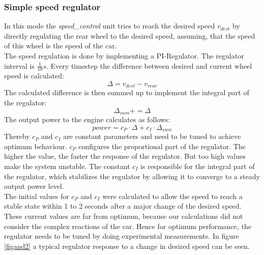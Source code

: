 \documentclass[a4paper
               ,10pt
               ,DIV=10 %
               ,BCOR=0.3cm
               ,pagesize %
               ,headings=small
               ,bibtotoc
               ]
               {scrartcl}
\begin{document}
\subsubsection{Simple speed regulator} \label{simplepi}
In this mode the \emph{speed\_control} unit tries to reach the desired speed $v_{dest}$ by directly regulating the rear wheel to the desired speed, assuming, that the speed of this wheel is the speed of the car.\\
The speed regulation is done by implementing a PI-Regulator. The regulator interval is $\frac{1}{10}s$. Every timestep the difference between desired and current wheel speed is calculated:
$$\Delta = v_{dest} - v_{rear}$$
The calculated difference is then summed up to implement the integral part of the regulator:
$$\Delta_{sum} += \Delta$$
The output power to the engine calculates as follows:
$$power = c_P \cdot \Delta + c_I \cdot \Delta_{sum}$$
Thereby $c_P$ and $c_I$ are constant parameters and need to be tuned to achieve optimum behaviour. $c_P$ configures the proportional part of the regulator. The higher the value, the faster the response of the regulator. But too high values make the system unstable. The constant $c_I$ is responsible for the integral part of the regulator, which stabilizes the regulator by allowing it to converge to a steady output power level.\\
The initial values for $c_P$ and $c_I$ were calculated to allow the speed to reach a stable state within 1 to 2 seconds after a major change of the desired speed. These current values are far from optimum, because our calculations did not consider the complex reactions of the car. Hence for optimum performance, the regulator needs to be tuned by doing experimental measurements. In figure \ref{figand2} a typical regulator response to a change in desired speed can be seen.
\end{document}
